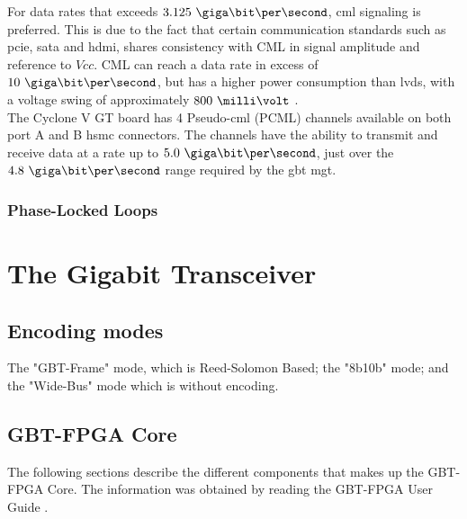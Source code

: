 \documentclass[main.tex]{subfiles}
\begin{document}
For data rates that exceeds $3.125\ \giga\bit\per\second$, \gls{cml} signaling is preferred. This is due to the fact that certain communication standards such as \acrshort{pcie}, \acrshort{sata} and \acrshort{hdmi}, shares consistency with CML in signal amplitude and reference to $Vcc$. CML can reach a data rate in excess of $10\ \giga\bit\per\second$, but has a higher power consumption than \gls{lvds}, with a voltage swing of approximately $800\ \milli\volt$ \cite{ti08lvds}.\\

The Cyclone V GT board has 4 Pseudo-\gls{cml} (PCML) channels available on both port A and B \gls{hsmc} connectors. The channels have the ability to transmit and receive data at a rate up to $5.0\ \giga\bit\per\second$, just over the $4.8\ \giga\bit\per\second$ range required by the \gls{gbt} \gls{mgt}. \cite{altera_cyclonekit}




\subsection{Phase-Locked Loops}




\chapter{The Gigabit Transceiver} \label{chap:gbt}


\section{Encoding modes}

The "GBT-Frame" mode, which is Reed-Solomon Based; the "8b10b" mode; and the "Wide-Bus" mode which is without encoding.

\section{GBT-FPGA Core}
The following sections describe the different components that makes up the GBT-FPGA Core. The information was obtained by reading the GBT-FPGA User Guide \cite{gbt_fpga}.
\end{document}
